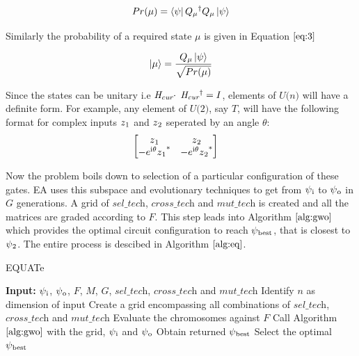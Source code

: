 \documentclass[conference]{IEEEtran}
\begin{document}
\begin{equation}
\label{eq:2}
Pr(\mu) = \bra{\psi} Q\textsubscript{$\mu$}\textsuperscript{$\dagger$}Q\textsubscript{$\mu$}\ket{\psi}
\end{equation}

Similarly the probability of a required state $\mu$ is given in Equation $\ref{eq:3}$

\begin{equation}
\label{eq:3}
\ket{\mu} = \frac{Q\textsubscript{$\mu$}\ket{\psi}}{\sqrt{Pr(\mu)}}
\end{equation}

Since the states can be unitary i.e $\textit{H\textsubscript{cur}} \cdot$ $\textit{H\textsubscript{cur}\textsuperscript{$\dagger$}} = I$, elements of $\textit{U(n)}$ will have a definite form. For example, any element of $\textit{U(2)}$, say $\textit{T}$, will have the following format for complex inputs $z\textsubscript{1}$ and $z\textsubscript{2}$ seperated by an angle $\theta$:
$$
\begin{bmatrix} 
{z\textsubscript{1}}&{z\textsubscript{2}}\\
{-e\textsuperscript{i$\theta$}z\textsubscript{1}\textsuperscript{*}}&{-e\textsuperscript{i$\theta$}z\textsubscript{2}\textsuperscript{*}}\\
\end{bmatrix}
\quad
$$

Now the problem boils down to selection of a particular configuration of these gates. EA uses this subspace and evolutionary techniques to get from  $\psi\textsubscript{i}$ to $\psi\textsubscript{o}$ in $\textit{G}$ generations. A grid of $\textit{sel\_tech}$, $\textit{cross\_tech}$ and $\textit{mut\_tech}$ is created and all the matrices are graded according to $\textit{F}$. This step leads into Algorithm $\ref{alg:gwo}$ which provides the optimal circuit configuration to reach $\psi\textsubscript{best}$, that is closest to $\psi\textsubscript{2}$. The entire process is descibed in Algorithm $\ref{alg:eq}$. 

\begin{algorithm}[!b]
\footnotesize
\caption{EQUATe}
\label{alg:eq}
\begin{algorithmic}[1]
\STATE \textbf{Input:} $\psi\textsubscript{i}$, $\psi\textsubscript{o}$, $\textit{F}$, $\textit{M}$, $\textit{G}$, $\textit{sel\_tech}$, $\textit{cross\_tech}$ and $\textit{mut\_tech}$
\STATE Identify $\textit{n}$ as dimension of input
\STATE Create a grid encompassing all combinations of $\textit{sel\_tech}$, $\textit{cross\_tech}$ and $\textit{mut\_tech}$
\STATE Evaluate the chromosomes against $\textit{F}$
\STATE Call Algorithm $\ref{alg:gwo}$ with the grid, $\psi\textsubscript{i}$ and $\psi\textsubscript{o}$ 
\STATE Obtain returned $\psi\textsubscript{best}$
\ENDFOR
\STATE Select the optimal $\psi\textsubscript{best}$
\end{algorithmic}
\end{algorithm}
\end{document}
